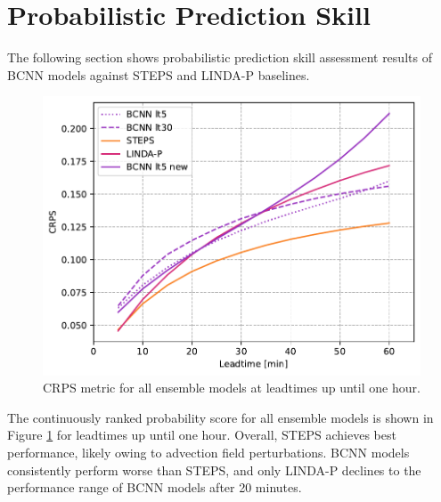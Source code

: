 \section{Probabilistic Prediction Skill}

The following section shows probabilistic prediction skill assessment results of BCNN models against STEPS and LINDA-P baselines.

\begin{figure}[H]
	\centering
	\includegraphics[width=0.6\linewidth]{images/metrics/ALL_CRPS}
	\caption{CRPS metric for all ensemble models at leadtimes up until one hour.}
	\label{fig:crps}
\end{figure}

The continuously ranked probability score for all ensemble models is shown in Figure \ref{fig:crps} for leadtimes up until one hour. Overall, STEPS achieves best performance, likely owing to advection field perturbations. BCNN models consistently perform worse than STEPS, and only LINDA-P declines to the performance range of BCNN models after 20 minutes.

